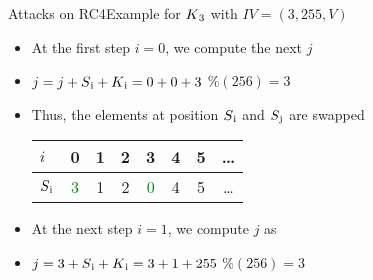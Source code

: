 \documentclass[
	aspectratio=169,	%
	onlytextwidth,		%
	t					%
	]{beamer}
\begin{document}
\begin{frame}[fragile]{Attacks on RC4}{Example for $K\textsubscript{3}$ with $IV=(3,255,V)$}
	\begin{itemize}
		\item At the first step $i=0$, we compute the next $j$
		\item $j = j + S\textsubscript{i} + K\textsubscript{i} = 0 + 0 + 3$ $\% (256) = 3$
		\item Thus, the elements at position $S\textsubscript{i}$ and $S\textsubscript{j}$ are swapped
		\medskip
		\begin{table}[h!]
			\begin{center}
			  \begin{tabular}{l|c|c|c|c|c|c|c}
				$i$ & 0 & 1 & 2 & 3 & 4 & 5 & \dots\\
				\hline
				$S\textsubscript{i}$ & \textcolor{green}{3} & 1 & 2 & \textcolor{green}{0} & 4 & 5 & \dots\\
			  \end{tabular}
			\end{center}
		  \end{table}
		\item At the next step $i = 1$, we compute $j$ as
		\item $j = 3 + S\textsubscript{i} + K\textsubscript{i} = 3 + 1 + 255$ $\% (256) = 3$
	\end{itemize}
\end{frame}
\end{document}
